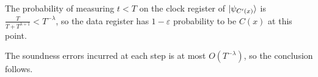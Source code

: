 \begin{prf}
	The probability of measuring $t<T$ on the clock register of $\ket{\psi_{C'(x)}}$ is $\frac{T}{T+T^{\lambda+1}}<T^{-\lambda}$,
	so the data register has $1-\varepsilon$ probability to be $C(x)$ at this point.

	The soundness errors incurred at each step is at most $O(T^{-\lambda})$, so the conclusion follows.
\end{prf}

